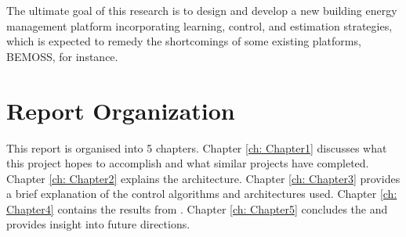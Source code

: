 The ultimate goal of this research is to design and develop a new building energy management
platform incorporating learning, control, and estimation strategies, which is expected to remedy the
shortcomings of some existing platforms, BEMOSS, for instance.

\section{Report Organization}
This report is organised into 5 chapters.  Chapter \ref{ch: Chapter1} discusses
what this project hopes to accomplish and what similar projects have completed.
Chapter \ref{ch: Chapter2} explains the architecture. Chapter \ref{ch: Chapter3}
provides a brief explanation of the control algorithms and architectures used.
Chapter \ref{ch: Chapter4} contains the results from . Chapter \ref{ch: Chapter5} concludes the  and provides insight into future directions.

